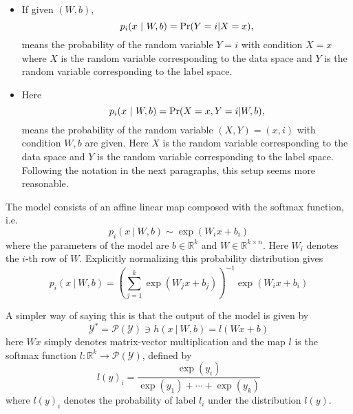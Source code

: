 \begin{itemize}
\item 
If given $(W,b)$,
\begin{equation}
p_i(x~|~W,b) = {\rm Pr}(Y=i | X = x),
\end{equation}
means the probability of the random variable $Y =i $ with condition $ X = x$ where 
$X$ is the random variable corresponding to the data space 
and $Y$ is the random variable corresponding to the label space.  

\item Here
\begin{equation}
p_i(x~|~W,b) = {\rm Pr}( X = x, Y = i | W ,b),
\end{equation}
means the probability of the random variable $(X,Y) = (x,i)$ with condition $W ,b$ are given. 
Here $X$ is the random variable corresponding to the data space 
and $Y$ is the random variable corresponding to the label space.  
Following the notation in the next paragraphs, this setup seems more reasonable.

\end{itemize}




The model consists of an affine linear map composed with the softmax function, i.e.
\begin{equation}
 p_i(x~|~W,b) \sim \exp(W_{i}x + b_i)
\end{equation}
where the parameters of the model are $b\in \mathbb{R}^k$ and $W\in \mathbb{R}^{k\times n}$. Here
$W_{i}$ denotes the $i$-th row of $W$. Explicitly normalizing this probability distribution gives
$$p_i(x~|~W,b) = \left(\displaystyle\sum_{j = 1}^k\exp(W_{j}x + b_j)\right)^{-1}\exp(W_{i}x + b_i)$$

A simpler way of saying this is that the output of the model is given by
\begin{equation}
 \mathcal{Y}^* = \mathcal{P}(\mathcal{Y})\ni h(x~|~W,b) = l(W x + b)
\end{equation}
here $W x$ simply denotes matrix-vector multiplication and the map $l$ is the softmax function
$l:\mathbb{R}^k\rightarrow \mathcal{P}(\mathcal{Y})$, defined by
$$l(y)_i = \frac{\exp(y_i)}{\exp(y_1) + \cdots + \exp(y_k)}$$
where $l(y)_i$ denotes the probability of label $l_i$ under the distribution $l(y)$.


